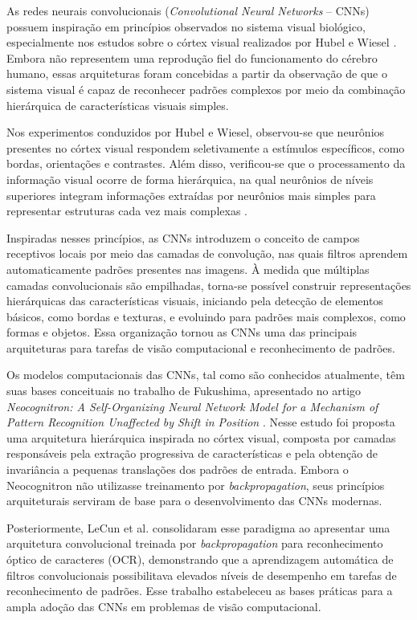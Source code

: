 \documentclass[11pt,a4paper]{article}
\begin{document}
As redes neurais convolucionais (\textit{Convolutional Neural Networks} -- CNNs) possuem inspiração em princípios observados no sistema visual biológico, especialmente nos estudos sobre o córtex visual realizados por Hubel e Wiesel \cite{hubel1962receptive}. Embora não representem uma reprodução fiel do funcionamento do cérebro humano, essas arquiteturas foram concebidas a partir da observação de que o sistema visual é capaz de reconhecer padrões complexos por meio da combinação hierárquica de características visuais simples.

Nos experimentos conduzidos por Hubel e Wiesel, observou-se que neurônios presentes no córtex visual respondem seletivamente a estímulos específicos, como bordas, orientações e contrastes. Além disso, verificou-se que o processamento da informação visual ocorre de forma hierárquica, na qual neurônios de níveis superiores integram informações extraídas por neurônios mais simples para representar estruturas cada vez mais complexas \cite{hubel1962receptive}.

Inspiradas nesses princípios, as CNNs introduzem o conceito de campos receptivos locais por meio das camadas de convolução, nas quais filtros aprendem automaticamente padrões presentes nas imagens. À medida que múltiplas camadas convolucionais são empilhadas, torna-se possível construir representações hierárquicas das características visuais, iniciando pela detecção de elementos básicos, como bordas e texturas, e evoluindo para padrões mais complexos, como formas e objetos. Essa organização tornou as CNNs uma das principais arquiteturas para tarefas de visão computacional e reconhecimento de padrões.


Os modelos computacionais das CNNs, tal como são conhecidos atualmente, têm suas bases conceituais no trabalho de Fukushima, apresentado no artigo \textit{Neocognitron: A Self-Organizing Neural Network Model for a Mechanism of Pattern Recognition Unaffected by Shift in Position} \cite{fukushima1980neocognitron}. Nesse estudo foi proposta uma arquitetura hierárquica inspirada no córtex visual, composta por camadas responsáveis pela extração progressiva de características e pela obtenção de invariância a pequenas translações dos padrões de entrada. Embora o Neocognitron não utilizasse treinamento por \textit{backpropagation}, seus princípios arquiteturais serviram de base para o desenvolvimento das CNNs modernas.

Posteriormente, LeCun et al. \cite{lecun1998gradient} consolidaram esse paradigma ao apresentar uma arquitetura convolucional treinada por \textit{backpropagation} para reconhecimento óptico de caracteres (OCR), demonstrando que a aprendizagem automática de filtros convolucionais possibilitava elevados níveis de desempenho em tarefas de reconhecimento de padrões. Esse trabalho estabeleceu as bases práticas para a ampla adoção das CNNs em problemas de visão computacional.
\end{document}
